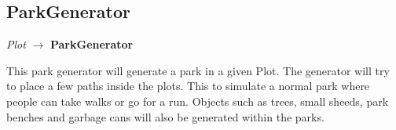 \subsection{ParkGenerator}
\begin{center}
    \textit{Plot} $\rightarrow$ \textbf{ParkGenerator}                        
\end{center}
This park generator will generate a park in a given Plot. 
The generator will try to place a few paths inside the plots. 
This to simulate a normal park where people can take walks or go for a run.
Objects such as trees, small sheeds, park benches and garbage cans will also be generated within the parks.